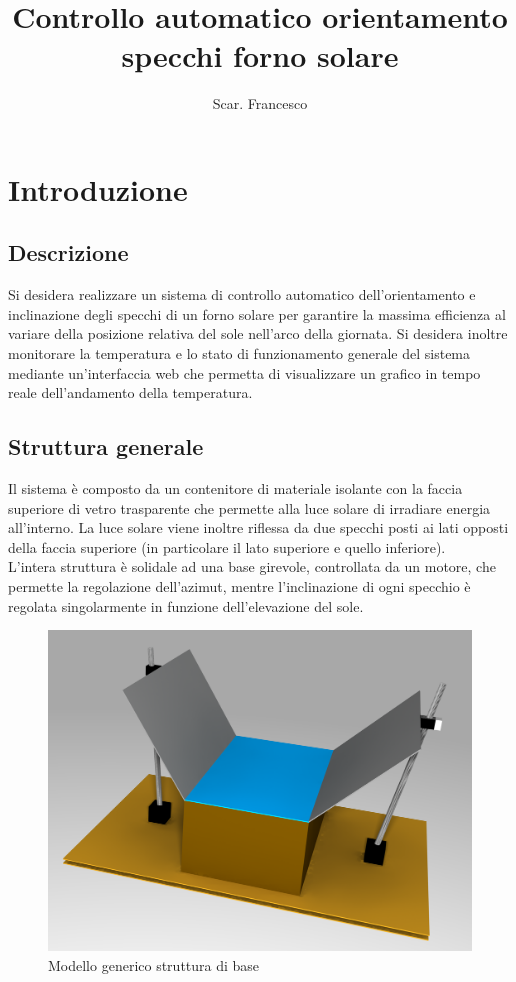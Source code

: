 \documentclass[12pt]{article}
\title{\textbf{Controllo automatico orientamento\\ specchi forno solare}}
\author{Scar. Francesco}
\date{}
\begin{document}
\maketitle

\tableofcontents{}


\newpage

\section{Introduzione}
    \subsection{Descrizione}
    Si desidera realizzare un sistema di controllo automatico dell'orientamento e inclinazione degli specchi di un forno solare per garantire la massima efficienza al variare della posizione relativa del sole nell'arco della giornata.
    Si desidera inoltre monitorare la temperatura e lo stato di funzionamento generale del sistema mediante un'interfaccia web che permetta di visualizzare un grafico in tempo reale dell'andamento della temperatura.


    \subsection{Struttura generale}
    Il sistema è composto da un contenitore di materiale isolante con la faccia superiore di vetro trasparente che permette alla luce solare di irradiare energia all'interno. La luce solare viene inoltre riflessa da due specchi posti ai lati opposti della faccia superiore (in particolare il lato superiore e quello inferiore).\\
    L'intera struttura è solidale ad una base girevole, controllata da un motore, che permette la regolazione dell'azimut, mentre l'inclinazione di ogni specchio è regolata singolarmente in funzione dell'elevazione del sole.
    
    \begin{figure}[h]
    \centering
        \includegraphics[width=\textwidth-100pt]{Draws/3D_render_cut.png}
        \caption{Modello generico struttura di base}
    \end{figure}
    
\end{document}
